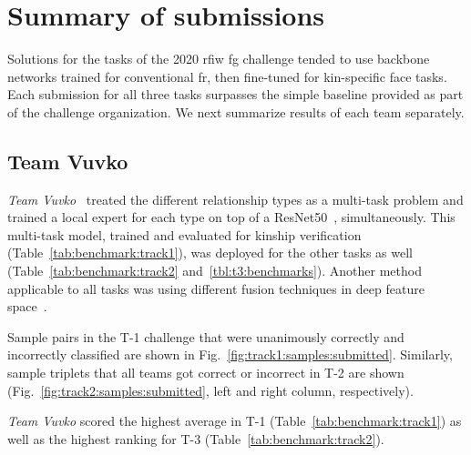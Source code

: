 \documentclass[letterpaper, 10 pt, conference]{ieeeconf}  %
\begin{document}
\section{Summary of submissions}

Solutions for the tasks of the 2020 \ac{rfiw} \ac{fg} challenge tended to use backbone networks trained for conventional \ac{fr}, then fine-tuned for kin-specific face tasks. Each submission for all three tasks surpasses the simple baseline provided as part of the challenge organization. We next summarize results of each team separately.

\subsection{Team Vuvko}
\emph{Team Vuvko}~\cite{id4} treated the different relationship types as a multi-task problem and trained a local expert for each type on top of a ResNet50~\cite{he2016deep}, simultaneously. This multi-task model, trained and evaluated for kinship verification (Table~\ref{tab:benchmark:track1}), was deployed for the other tasks as well (Table~\ref{tab:benchmark:track2} and~\ref{tbl:t3:benchmarks}). Another method applicable to all tasks was using different fusion techniques in deep feature space~\cite{id6, id8}. 

Sample pairs in the T-1 challenge that were unanimously correctly and incorrectly classified are shown in Fig.~\ref{fig:track1:samples:submitted}. Similarly, sample triplets that all teams got correct or incorrect in T-2 are shown (Fig.~\ref{fig:track2:samples:submitted}, left and right column, respectively).

\emph{Team Vuvko} scored the highest average in T-1 (Table~\ref{tab:benchmark:track1}) as well as the highest ranking for T-3 (Table~\ref{tab:benchmark:track2}). 
\end{document}
